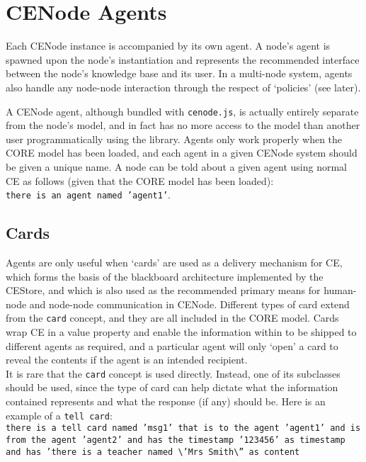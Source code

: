 \documentclass{article}
\begin{document}
\section{CENode Agents}
Each CENode instance is accompanied by its own agent. A node's agent is spawned upon the node's instantiation and represents the recommended interface between the node's knowledge base and its user. In a multi-node system, agents also handle any node-node interaction through the respect of `policies' (see later).

A CENode agent, although bundled with \texttt{cenode.js}, is actually entirely separate from the node's model, and in fact has no more access to the model than another user programmatically using the library. Agents only work properly when the CORE model has been loaded, and each agent in a given CENode system should be given a unique name. A node can be told about a given agent using normal CE as follows (given that the CORE model has been loaded):\\
\texttt{there is an agent named 'agent1'}.

\subsection{Cards}

Agents are only useful when `cards' are used as a delivery mechanism for CE, which forms the basis of the blackboard architecture implemented by the CEStore, and which is also used as the recommended primary means for human-node and node-node communication in CENode. Different types of card extend from the \texttt{card} concept, and they are all included in the CORE model. Cards wrap CE in a value property and enable the information within to be shipped to different agents as required, and a particular agent will only `open' a card to reveal the contents if the agent is an intended recipient. \\

It is rare that the \texttt{card} concept is used directly. Instead, one of its subclasses should be used, since the type of card can help dictate what the information contained represents and what the response (if any) should be. Here is an example of a \texttt{tell card}:\\
\texttt{there is a tell card named 'msg1' that is to the agent 'agent1' and is from the agent 'agent2' and has the timestamp '123456' as timestamp and has 'there is a teacher named \textbackslash'Mrs Smith\textbackslash'' as content}\\
\end{document}
